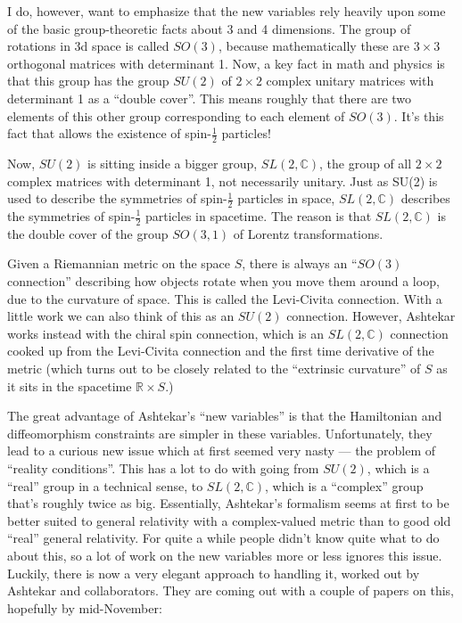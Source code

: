 \documentclass{article}
\begin{document}
I do, however, want to emphasize that the new variables rely heavily
upon some of the basic group-theoretic facts about 3 and 4 dimensions.
The group of rotations in 3d space is called \(SO(3)\), because
mathematically these are \(3\times3\) orthogonal matrices with
determinant 1. Now, a key fact in math and physics is that this group
has the group \(SU(2)\) of \(2\times2\) complex unitary matrices with
determinant 1 as a ``double cover''. This means roughly that there are
two elements of this other group corresponding to each element of
\(SO(3)\). It's this fact that allows the existence of spin-\(\frac12\)
particles!

Now, \(SU(2)\) is sitting inside a bigger group, \(SL(2,\mathbb{C})\),
the group of all \(2\times2\) complex matrices with determinant 1, not
necessarily unitary. Just as SU(2) is used to describe the symmetries of
spin-\(\frac12\) particles in space, \(SL(2,\mathbb{C})\) describes the
symmetries of spin-\(\frac12\) particles in spacetime. The reason is
that \(SL(2,\mathbb{C})\) is the double cover of the group \(SO(3,1)\)
of Lorentz transformations.

Given a Riemannian metric on the space \(S\), there is always an
``\(SO(3)\) connection'' describing how objects rotate when you move
them around a loop, due to the curvature of space. This is called the
Levi-Civita connection. With a little work we can also think of this as
an \(SU(2)\) connection. However, Ashtekar works instead with the chiral
spin connection, which is an \(SL(2,\mathbb{C})\) connection cooked up
from the Levi-Civita connection and the first time derivative of the
metric (which turns out to be closely related to the ``extrinsic
curvature'' of \(S\) as it sits in the spacetime
\(\mathbb{R} \times S\).)

The great advantage of Ashtekar's ``new variables'' is that the
Hamiltonian and diffeomorphism constraints are simpler in these
variables. Unfortunately, they lead to a curious new issue which at
first seemed very nasty --- the problem of ``reality conditions''. This
has a lot to do with going from \(SU(2)\), which is a ``real'' group in
a technical sense, to \(SL(2,\mathbb{C})\), which is a ``complex'' group
that's roughly twice as big. Essentially, Ashtekar's formalism seems at
first to be better suited to general relativity with a complex-valued
metric than to good old ``real'' general relativity. For quite a while
people didn't know quite what to do about this, so a lot of work on the
new variables more or less ignores this issue. Luckily, there is now a
very elegant approach to handling it, worked out by Ashtekar and
collaborators. They are coming out with a couple of papers on this,
hopefully by mid-November:
\end{document}
